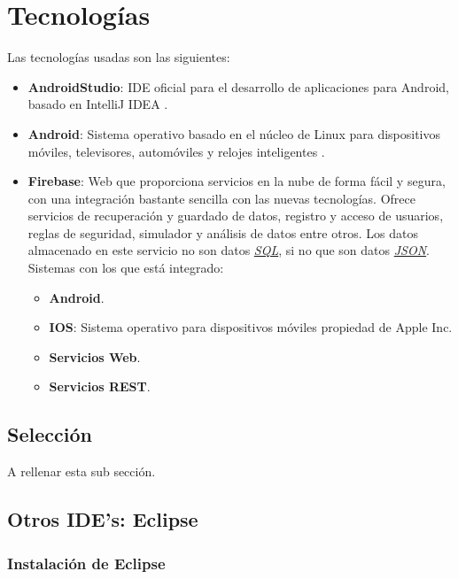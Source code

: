 \section{Tecnologías}
	Las tecnologías usadas son las siguientes:
	\begin{itemize}
		\item {\bf AndroidStudio}\cite{1:androidstudio:online}: IDE\cite{12:ide:online} oficial para el desarrollo de aplicaciones para Android, basado en IntelliJ IDEA \cite{3:intellij:online}.
		\item {\bf Android}\cite{2:android:online}: Sistema operativo basado en el núcleo de Linux \cite{4:nucleolinux:online} para dispositivos móviles, televisores, automóviles y relojes inteligentes \cite{5:wearables:online}.
		\item {\bf Firebase}\cite{6:firebase:online}: Web que proporciona servicios en la nube de forma fácil y segura, con una integración bastante sencilla con las nuevas tecnologías. Ofrece servicios de recuperación y guardado de datos, registro y acceso de usuarios, reglas de seguridad, simulador y análisis de datos entre otros. Los datos almacenado en este servicio no son datos \href{http://es.wikipedia.org/wiki/SQL}{\textit{SQL}}\cite{8:jquery:online}\cite{9:jquery:online}, si no que son datos \href{http://es.wikipedia.org/wiki/JSON}{\textit{JSON}}\cite{7:json:online}. Sistemas con los que está integrado:
		\begin{itemize}
			\item {\bf Android}\cite{2:android:online}.
			\item {\bf IOS}\cite{10:ios:online}: Sistema operativo para dispositivos móviles propiedad de Apple Inc.
			\item {\bf Servicios Web}.
			\item {\bf Servicios REST}\cite{11:rest:online}.
		\end{itemize}
	\end{itemize}
	
	\subsection{Selección}
	A rellenar esta sub sección.
	
	\subsection{Otros IDE's: Eclipse}
	
	\subsubsection{Instalación de Eclipse}
	
